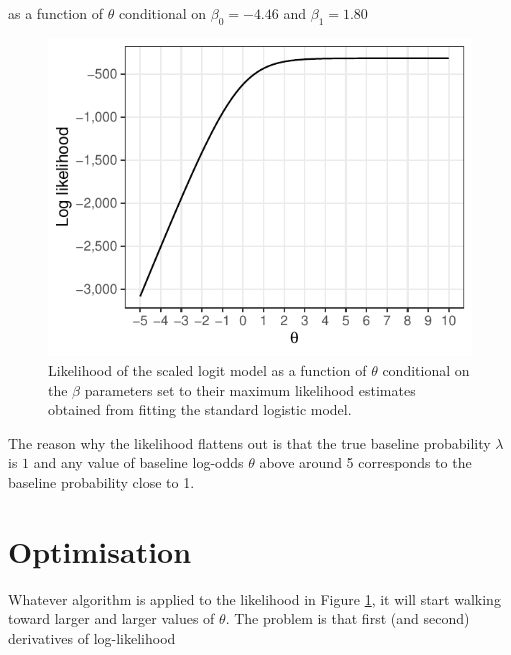 \documentclass[]{article}
\begin{document}
as a function of \(\theta\) conditional on \(\beta_0 = -4.46\) and \(\beta_1 = 1.80\)

\pagebreak



\begin{figure}

{\centering \includegraphics{graph/theta1} 

}

\caption{Likelihood of the scaled logit model as a function of \(\theta\) conditional on the \(\beta\) parameters set to their maximum likelihood estimates obtained from fitting the standard logistic model.}\label{fig:theta1}
\end{figure}

The reason why the likelihood flattens out is that the true baseline probability \(\lambda\) is \(1\) and any value of baseline log-odds \(\theta\) above around 5 corresponds to the baseline probability close to 1.

\pagebreak

\hypertarget{optimisation}{%
\section{Optimisation}\label{optimisation}}

Whatever algorithm is applied to the likelihood in Figure \ref{fig:theta1}, it will start walking toward larger and larger values of \(\theta\). The problem is that first (and second) derivatives of log-likelihood
\end{document}
